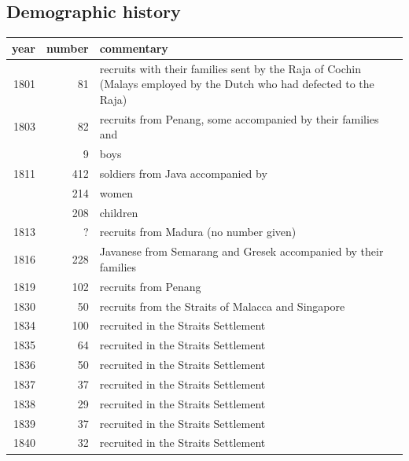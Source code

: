 \subsection{Demographic history}\label{sec:slmbg:DemographichistoryduringBritishRule}

\begin{table}
    \centering
        \begin{tabular}{rrl}
        year & number & commentary\\
        \hline
        1801 & 81     & \parbox[t]{8cm}{
                                         recruits with their families sent by the Raja of Cochin (Malays
                                         employed by the Dutch who had defected to the Raja)}\\
        1803 & 82       &\parbox[t]{8cm}{recruits from Penang, some accompanied by their families
                          and}\\
           & 9      &\parbox[t]{8cm}{boys}\\
      1811 & 412        &\parbox[t]{8cm}{soldiers from Java accompanied by}\\
             & 214    &\parbox[t]{8cm}{women}\\
           & 208    &\parbox[t]{8cm}{children}\\
      1813 & ?      &\parbox[t]{8cm}{recruits from Madura (no number given)}\\
      1816 & 228    &\parbox[t]{8cm}{Javanese from Semarang and Gresek accompanied by their
                        families}\\
      1819 & 102    &\parbox[t]{8cm}{recruits from Penang}\\
      1830 &  50    &\parbox[t]{8cm}{recruits from the Straits of Malacca and Singapore}\\
      1834 & 100    &\parbox[t]{8cm}{recruited in the Straits Settlement}\\
      1835 &  64    &\parbox[t]{8cm}{recruited in the Straits Settlement}\\
      1836 &  50    &\parbox[t]{8cm}{recruited in the Straits Settlement}\\
      1837 &  37    &\parbox[t]{8cm}{recruited in the Straits Settlement}\\
      1838 &  29    &\parbox[t]{8cm}{recruited in the Straits Settlement}\\
      1839 &  37    &\parbox[t]{8cm}{recruited in the Straits Settlement}\\
      1840 &  32    &\parbox[t]{8cm}{recruited in the Straits Settlement}\\

\end{tabular}
\end{table}
